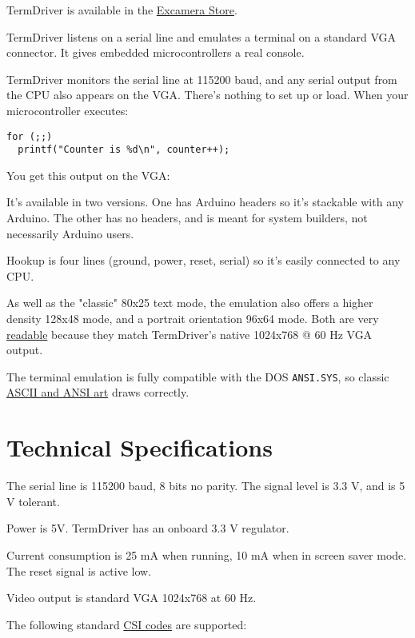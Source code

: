\documentclass{article}
\begin{document}
\leavevmode\hypertarget{termdriver}{}%
TermDriver is available in the
\href{http://excamera.com/sphinx/gameduino/store.html}{Excamera Store}.

TermDriver listens on a serial line and emulates a terminal on a
standard VGA connector. It gives embedded microcontrollers a real
console.

TermDriver monitors the serial line at 115200 baud, and any serial
output from the CPU also appears on the VGA. There's nothing to set up
or load. When your microcontroller executes:

\begin{verbatim}
for (;;)
  printf("Counter is %d\n", counter++);
\end{verbatim}

You get this output on the VGA:

It's available in two versions. One has Arduino headers so it's
stackable with any Arduino. The other has no headers, and is meant for
system builders, not necessarily Arduino users.

Hookup is four lines (ground, power, reset, serial) so it's easily
connected to any CPU.

As well as the "classic" 80x25 text mode, the emulation also offers a
higher density 128x48 mode, and a portrait orientation 96x64 mode. Both
are very \href{http://excamera.com/files/DSC_8931.jpg}{readable} because
they match TermDriver's native 1024x768 @ 60 Hz VGA output.

The terminal emulation is fully compatible with the DOS
\texttt{ANSI.SYS}, so classic
\href{http://artscene.textfiles.com/ansi/}{ASCII and ANSI art} draws
correctly.

\hypertarget{technical-specifications}{}
\hypertarget{technical-specifications}{%
\section{Technical Specifications}\label{technical-specifications}}

The serial line is 115200 baud, 8 bits no parity. The signal level is
3.3 V, and is 5 V tolerant.

Power is 5V. TermDriver has an onboard 3.3 V regulator.

Current consumption is 25 mA when running, 10 mA when in screen saver
mode. The reset signal is active low.

Video output is standard VGA 1024x768 at 60 Hz.

The following standard
\href{https://en.wikipedia.org/wiki/ANSI_escape_code\#CSI_sequences}{CSI
codes} are supported:
\end{document}
